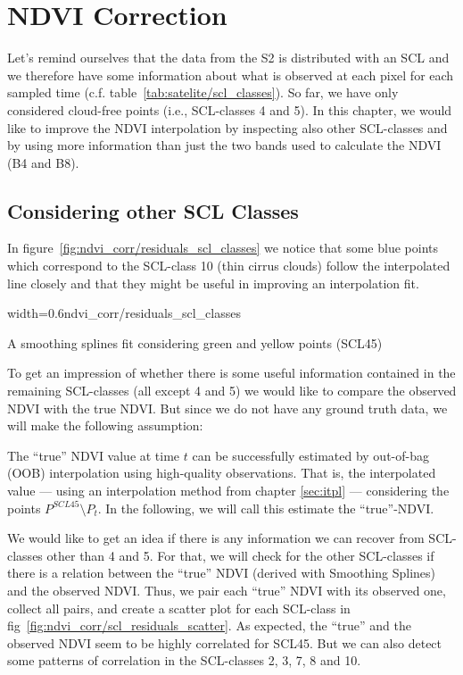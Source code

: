 \chapter{NDVI Correction} \label{sec:corr}

{
    Let's remind ourselves that the data from the S2 is distributed  with an SCL and we therefore have some information about what is observed at each pixel for each sampled time (c.f. table~\ref{tab:satelite/scl_classes}). So far, we have only considered cloud-free points (i.e., SCL-classes 4 and 5). In this chapter, we would like to improve the NDVI interpolation by inspecting also other SCL-classes and by using more information than just the two bands used to calculate the NDVI (B4 and B8).
}

\section{Considering other SCL Classes}{
    In figure~\ref{fig:ndvi_corr/residuals_scl_classes} we notice that some blue points which correspond to the SCL-class 10 (thin cirrus clouds) follow the interpolated line closely and that they might be useful in improving an interpolation fit.

    \begin{my_figure}[ht]{width=0.6\textwidth}{ndvi_corr/residuals_scl_classes}
        \caption{A smoothing splines fit considering green and yellow points (SCL45)}
        \label{fig:ndvi_corr/residuals_scl_classes}
    \end{my_figure}

    To get an impression of whether there is some useful information contained in the remaining SCL-classes (all except 4 and 5) we would like to compare the observed NDVI with the true NDVI. But since we do not have any ground truth data, we will make the following assumption:

    \begin{assumption}{1}%
        \label{true_ndvi_assumption}
        The ``true'' NDVI value at time $t$ can be successfully estimated by out-of-bag (OOB) interpolation using high-quality observations. That is, the interpolated value --- using an interpolation method from chapter \ref{sec:itpl} --- considering the points $P^{SCL45}\setminus P_t$. In the following, we will call this estimate the ``true''-NDVI.
    \end{assumption}

    We would like to get an idea if there is any information we can recover from SCL-classes other than 4 and 5. For that, we will check for the other SCL-classes if there is a relation between the ``true'' NDVI (derived with Smoothing Splines) and the observed NDVI. Thus, we pair each ``true'' NDVI with its observed one, collect all pairs, and create a scatter plot for each SCL-class in fig~\ref{fig:ndvi_corr/scl_residuals_scatter}.
    As expected, the ``true'' and the observed NDVI seem to be highly correlated for SCL45. But we can also detect some patterns of correlation in the SCL-classes 2, 3, 7, 8 and 10.  

}
